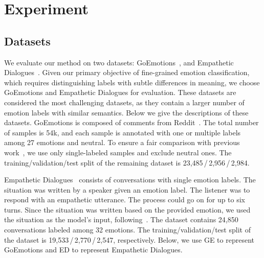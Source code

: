 \section{Experiment}
\subsection{Datasets}
We evaluate our method on two datasets:
GoEmotions~\cite{demszky-etal-2020-goemotions}, and Empathetic Dialogues~\cite{rashkin-etal-2019-towards}. 
Given our primary objective of fine-grained emotion classification, which requires distinguishing labels with subtle differences in meaning, we choose GoEmotions and Empathetic Dialogues for evaluation. These datasets are considered the most challenging datasets, as they contain a larger number of emotion labels with similar semantics.
Below we give the descriptions of these datasets.
GoEmotions is composed of comments from
Reddit~\cite{demszky-etal-2020-goemotions}. The total number of samples is 54k,
and each sample is annotated with one or multiple labels among 27 emotions and
neutral. To ensure a fair comparison with previous work~\cite{suresh-ong-2021-negatives}, 
we use only single-labeled samples and
exclude neutral ones. 
The training/validation/test split of the remaining dataset is 23,485\,/\,2,956\,/\,2,984.

Empathetic Dialogues~\cite{rashkin-etal-2019-towards} consists of conversations
with single emotion labels.  The situation was written by a speaker given an
emotion label. The listener was to respond with an empathetic utterance.
The process could go on for up to six turns.  Since the situation was written
based on the provided emotion, we used the situation as the model's input, 
following~\citet{suresh-ong-2021-negatives}. The dataset contains 24,850
conversations labeled among 32 emotions. The training/validation/test split of
the dataset is 19,533\,/\,2,770\,/\,2,547, respectively. Below, we use GE to
represent GoEmotions and ED to represent Empathetic Dialogues.


